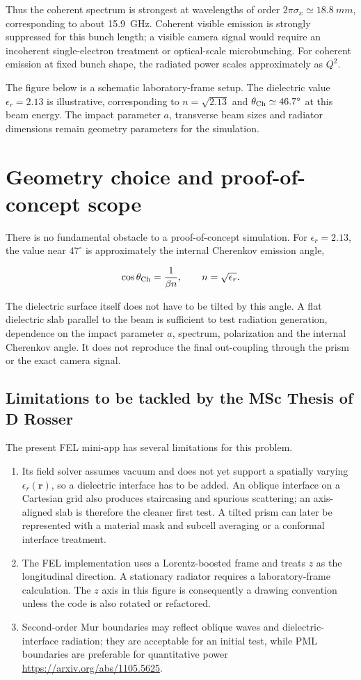 \documentclass[a4paper,11pt]{article}
\begin{document}
Thus the coherent spectrum is strongest at wavelengths of order $2\pi\sigma_x\simeq\SI{18.8}{mm}$, corresponding to about \SI{15.9}{GHz}.  Coherent visible emission is strongly suppressed for this bunch length; a visible camera signal would require an incoherent single-electron treatment or optical-scale microbunching.  For coherent emission at fixed bunch shape, the radiated power scales approximately as $Q^2$.

The figure below is a schematic laboratory-frame setup.  The dielectric value $\epsilon_r=2.13$ is illustrative, corresponding to $n=\sqrt{2.13}$ and $\theta_{\rm Ch}\simeq46.7^\circ$ at this beam energy.  The impact parameter $a$, transverse beam sizes and radiator dimensions remain geometry parameters for the simulation.

\section{Geometry choice and proof-of-concept scope}

There is no fundamental obstacle to a proof-of-concept simulation.  For $\epsilon_r=2.13$, the value near $47^\circ$ is approximately the internal Cherenkov emission angle,

\[
  \cos\theta_{\rm Ch}=\frac{1}{\beta n},
  \qquad n=\sqrt{\epsilon_r}.
\]

The dielectric surface itself does not have to be tilted by this angle.  A flat dielectric slab parallel to the beam is sufficient to test radiation generation, dependence on the impact parameter $a$, spectrum, polarization and the internal Cherenkov angle.  It does not reproduce the final out-coupling through the prism or the exact camera signal.

\subsection{Limitations to be tackled by the MSc Thesis of D Rosser}
The present FEL mini-app has several limitations for this problem.  
\begin{enumerate}
\item Its field solver assumes vacuum and does not yet support a spatially varying $\epsilon_r(\mathbf r)$, so a dielectric interface has to be added.  An oblique interface on a Cartesian grid also produces staircasing and spurious scattering; an axis-aligned slab is therefore the cleaner first test.  A tilted prism can later be represented with a material mask and subcell averaging or a conformal interface treatment.

\item The FEL implementation uses a Lorentz-boosted frame and treats $z$ as the longitudinal direction.  A stationary radiator requires a laboratory-frame calculation.  The $z$ axis in this figure is consequently a drawing convention unless the code is also rotated or refactored.  

\item Second-order Mur boundaries may reflect oblique waves and dielectric-interface radiation; they are acceptable for an initial test, while PML boundaries are preferable for quantitative power \url{https://arxiv.org/abs/1105.5625}.
\end{enumerate}
\end{document}
